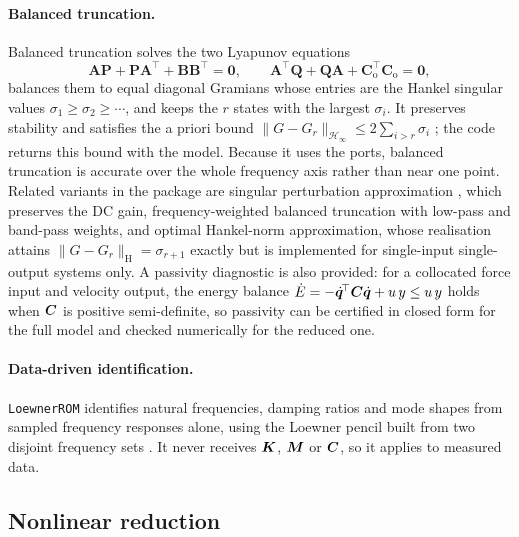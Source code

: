 \paragraph{Balanced truncation.}
Balanced truncation \cite{moore1981} solves the two Lyapunov equations
\begin{equation}
  \bm A\bm P+\bm P\bm A^{\!\top}+\bm B\bm B^{\!\top}=\bm 0,\qquad
  \bm A^{\!\top}\bm Q+\bm Q\bm A+\bm C_{\mathrm o}^{\!\top}\bm C_{\mathrm o}=\bm 0,
  \label{eq:lyap}
\end{equation}
balances them to equal diagonal Gramians whose entries are the Hankel singular values $\sigma_1\ge\sigma_2\ge\cdots$, and keeps the $r$ states with the largest $\sigma_i$. It preserves stability and satisfies the a priori bound
$\|G-G_r\|_{\mathcal H_\infty}\le2\sum_{i>r}\sigma_i$ \cite{enns1984,glover1984}; the code returns this bound with the model. Because it uses the ports, balanced truncation is accurate over the whole frequency axis rather than near one point.
Related variants in the package are singular perturbation approximation \cite{liu1989spa}, which preserves the DC gain, frequency-weighted balanced truncation with low-pass and band-pass weights, and optimal Hankel-norm approximation, whose realisation \cite{glover1984} attains $\|G-G_r\|_{\mathrm H}=\sigma_{r+1}$ exactly but is implemented for single-input single-output systems only.
A passivity diagnostic is also provided: for a collocated force input and velocity output, the energy balance $\dot E=-\dot{\bm q}^{\!\top}\bm{C}\dot{\bm q}+u\,y\le u\,y$ holds when $\bm{C}$ is positive semi-definite, so passivity can be certified in closed form for the full model and checked numerically for the reduced one.

\paragraph{Data-driven identification.}
\texttt{LoewnerROM} identifies natural frequencies, damping ratios and mode shapes from sampled frequency responses alone, using the Loewner pencil built from two disjoint frequency sets \cite{mayo2007loewner}. It never receives $\bm{K}$, $\bm{M}$ or $\bm{C}$, so it applies to measured data.

\subsection{Nonlinear reduction}\label{sec:rom:nl}
